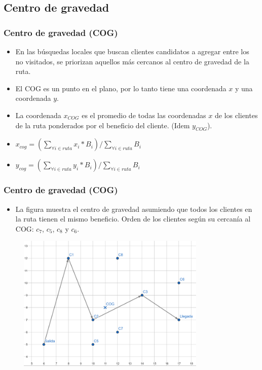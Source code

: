 \documentclass{beamer}
\begin{document}

\subsection{Centro de gravedad}

\begin{frame}
\frametitle{Centro de gravedad (COG)}

\begin{itemize}
    \item En las búsquedas locales que buscan clientes candidatos a agregar entre los no visitados, se priorizan aquellos más cercanos al centro de gravedad de la ruta.
    \pause 
    \item El COG es un punto en el plano, por lo tanto tiene una coordenada $x$ y una coordenada $y$.
    \pause 
    \item La coordenada $x_{COG}$ es el promedio de todas las coordenadas $x$ de los clientes de la ruta ponderados por el beneficio del cliente. (Idem $y_{COG}$).
    \pause 
    \item $x_{cog} = (\sum_{\forall i \in ruta} x_i * B_i) / \sum_{\forall i \in ruta} B_i$
    \pause 
    \item $y_{cog} = (\sum_{\forall i \in ruta} y_i * B_i) / \sum_{\forall i \in ruta} B_i$
\end{itemize}

\end{frame}


\begin{frame}
\frametitle{Centro de gravedad (COG)}

\begin{itemize}
    \item La figura muestra el centro de gravedad asumiendo que todos los clientes en la ruta tienen el mismo beneficio. Orden de los clientes según su cercanía al COG: $c_7$, $c_5$, $c_8$ y $c_6$.
\end{itemize}

\begin{figure}[h]
	\centering
	\includegraphics[width=9cm]{COG}
	\label{fig:COG}
\end{figure}

\end{frame}
\end{document}

